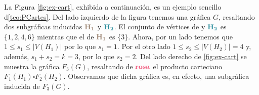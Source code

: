 La Figura \ref{fig:ex-cart}, exhibida a continuaci\'on, es un ejemplo sencillo
d\cref{teo:PCartes}. Del lado izquierdo de la figura tenemos una gr\'afica $G$,
resaltando dos subgr\'aficas inducidas ${\color{baige}\bf H_1}$ y
${\color{azulMetal}\bf H_2}$. El conjunto de v\'ertices de  y
${\color{azulMetal}\bf H_2}$  es $\{1,2,4,6\}$ mientras que el de
${\color{baige}\bf H_1}$ es $\{3\}$. Ahora, por un lado tenemos que $1\leq s_1
\leq |V(H_1)|$ por lo que $s_1 =1$. Por el otro lado $1\leq s_2 \leq |V(H_2)| =
4$ y, adem\'as, $s_1+s_2 = k =3$, por lo que $s_2 =2$. Del lado derecho de
\cref{fig:ex-cart} se muestra la gr\'afica $F_3(G)$, resaltando de
$\color{fushia} \bf rosa$ el producto carteciano $F_1(H_1) \square F_2(H_2)$.
Observamos que dicha gr\'afica es, en efecto, una subgr\'afica inducida de
$F_3(G)$.

\begin{figure}[ht!]
    \centering
\end{figure}
